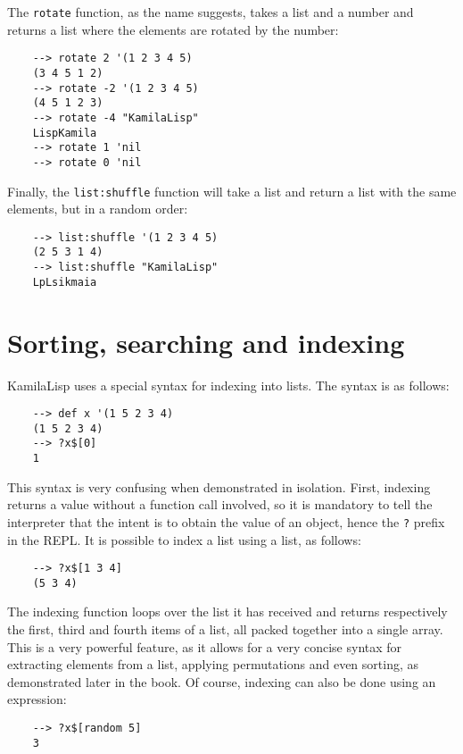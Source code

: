The \verb|rotate| function, as the name suggests, takes a list and a number and returns a list where the elements are rotated by the number:

\begin{Verbatim}
    --> rotate 2 '(1 2 3 4 5)
    (3 4 5 1 2)
    --> rotate -2 '(1 2 3 4 5)
    (4 5 1 2 3)
    --> rotate -4 "KamilaLisp"
    LispKamila
    --> rotate 1 'nil
    --> rotate 0 'nil
\end{Verbatim}

Finally, the \verb|list:shuffle| function will take a list and return a list with the same elements, but in a random order:

\begin{Verbatim}
    --> list:shuffle '(1 2 3 4 5)
    (2 5 3 1 4)
    --> list:shuffle "KamilaLisp"
    LpLsikmaia
\end{Verbatim}

\section{Sorting, searching and indexing}

KamilaLisp uses a special syntax for indexing into lists. The syntax is as follows:

\begin{Verbatim}
    --> def x '(1 5 2 3 4)
    (1 5 2 3 4)
    --> ?x$[0]
    1
\end{Verbatim}

This syntax is very confusing when demonstrated in isolation. First, indexing returns a value without a function call involved, so it is mandatory to tell the interpreter that the intent is to obtain the value of an object, hence the \verb|?| prefix in the REPL. It is possible to index a list using a list, as follows:

\begin{Verbatim}
    --> ?x$[1 3 4]
    (5 3 4)
\end{Verbatim}

The indexing function loops over the list it has received and returns respectively the first, third and fourth items of a list, all packed together into a single array. This is a very powerful feature, as it allows for a very concise syntax for extracting elements from a list, applying permutations and even sorting, as demonstrated later in the book. Of course, indexing can also be done using an expression:

\begin{Verbatim}
    --> ?x$[random 5]
    3
\end{Verbatim}

